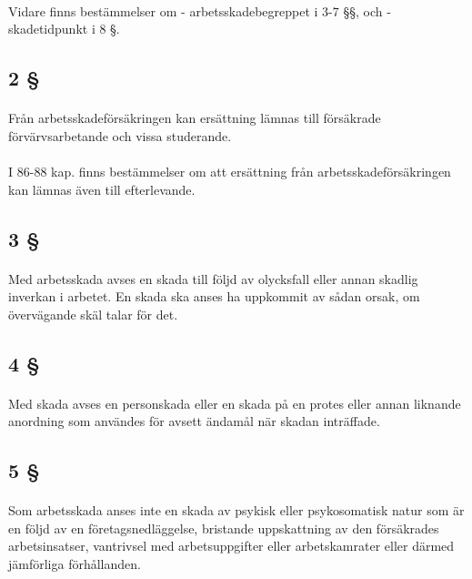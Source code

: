 \documentclass[a4paper,notitlepage,openany,10pt]{book}
\begin{document}
\paragraph*{}
Vidare finns bestämmelser om
\newline - arbetsskadebegreppet i 3-7 §§, och
\newline - skadetidpunkt i 8 §.
\subsection*{2 §}
\paragraph*{}
Från arbetsskadeförsäkringen kan ersättning lämnas till försäkrade förvärvsarbetande och vissa studerande.
\paragraph*{}
I 86-88 kap. finns bestämmelser om att ersättning från arbetsskadeförsäkringen kan lämnas även till efterlevande.
\subsection*{3 §}
\paragraph*{}
Med arbetsskada avses en skada till följd av olycksfall eller annan skadlig inverkan i arbetet. En skada ska anses ha uppkommit av sådan orsak, om övervägande skäl talar för det.
\subsection*{4 §}
\paragraph*{}
Med skada avses en personskada eller en skada på en protes eller annan liknande anordning som användes för avsett ändamål när skadan inträffade.
\subsection*{5 §}
\paragraph*{}
Som arbetsskada anses inte en skada av psykisk eller psykosomatisk natur som är en följd av en företagsnedläggelse, bristande uppskattning av den försäkrades arbetsinsatser, vantrivsel med arbetsuppgifter eller arbetskamrater eller därmed jämförliga förhållanden.
\end{document}
